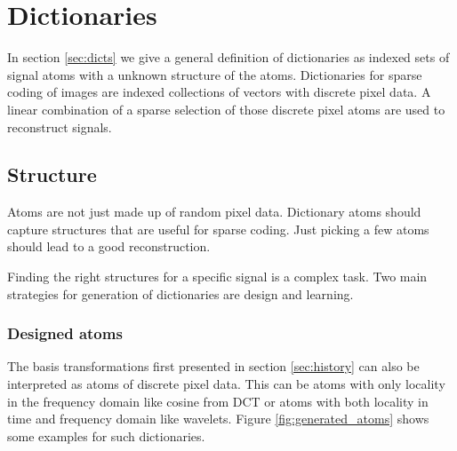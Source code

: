 \chapter{Dictionaries}
In section \ref{sec:dicts} we give a general definition of dictionaries 
as indexed sets of signal atoms with a unknown structure of the atoms.
Dictionaries for sparse coding of images are indexed collections of vectors with
discrete pixel data. A linear combination of a sparse selection of those
discrete pixel atoms are used to reconstruct signals. 

\section{Structure}
Atoms are not just made up of random pixel data. Dictionary atoms should
capture structures that are useful for sparse coding. Just picking a few atoms
should lead to a good reconstruction. 

Finding the right structures for a specific signal is a complex task.
Two main strategies for generation of dictionaries are design and
learning.

\subsection{Designed atoms}
The basis transformations first presented in section \ref{sec:history} can also
be interpreted as atoms of discrete pixel data. This can be atoms with only
locality in the frequency domain like cosine from DCT or atoms with both
locality in time and frequency domain like wavelets. Figure
\ref{fig:generated_atoms} shows some examples for such dictionaries. 


